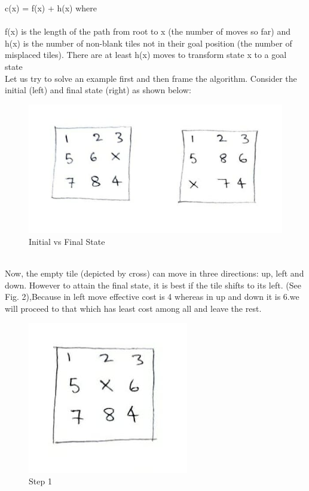 \documentclass[conference]{IEEEtran}
\begin{document}
c(x) = f(x) + h(x) where\\\\
f(x) is the length of the path from root to x (the number of moves so far) and\\
h(x) is the number of non-blank tiles not in their goal position (the number of misplaced tiles). There are at least h(x) moves to transform state x to a goal state\\

Let us try to solve an example first and then frame the algorithm. Consider the initial (left) and final state (right) as shown below:\\
\begin{figure}[htbp]
    \centering
    \includegraphics[scale = 0.45]{InitialvsFinal.jpeg}
    \caption{Initial vs Final State}
\end{figure}\\


Now, the empty tile (depicted by cross) can move in three directions: up, left and down. However to attain the final state, it is best if the tile shifts to its left. (See Fig. 2),Because in left move effective cost is 4 whereas in up and down it is 6.we will proceed to that which has least cost among all and leave the rest. \\
\begin{figure}[htbp]
    \centering
    \includegraphics[scale = 0.50]{step1.jpeg}
    \caption{Step 1}
\end{figure}\\
\end{document}
